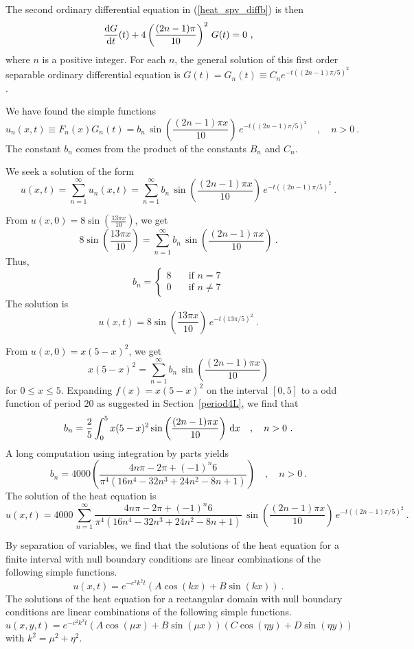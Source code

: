 \begin{egg}
The second ordinary differential equation in (\ref{heat_spv_diffb}) is then
\[
\frac{\mathrm{d}G}{\mathrm{d}{t}}(t) + 4\left(\frac{(2n-1)\pi}{10}\right)^2\,G(t) = 0 \ ,
\]
where $n$ is a positive integer.  For each $n$, the general solution
of this first order separable ordinary differential equation is
$\displaystyle G(t) = G_n(t) \equiv C_n e^{-t ((2n-1)\pi/5)^2}$.

We have found the simple functions
\[
u_n(x,t) \equiv F_n(x)G_n(t) = b_n\,\sin\left(\frac{(2n-1)\pi x}{10}\right)
\, e^{-t ((2n-1)\pi/5)^2} \quad , \quad n > 0 \ .
\]
The constant $b_n$ comes from the product of the constants $B_n$ and
$C_n$.

We seek a solution of the form
\[
u(x,t) = \sum_{n=1}^\infty u_n(x,t)
= \sum_{n=1}^\infty b_n\,\sin\left(\frac{(2n-1)\pi x}{10}\right)
\, e^{-t ((2n-1)\pi/5)^2} \  .
\]

 From
$\displaystyle u(x,0) = 8 \sin\left(\frac{13\pi x}{10}\right)$,
we get
\[
8 \sin\left(\frac{13\pi x}{10}\right)
= \sum_{n=1}^\infty b_n\,\sin\left(\frac{(2n-1)\pi x}{10}\right) \  .
\]
Thus,
\[
b_n =
\begin{cases}
8 & \quad \text{if $n=7$} \\
0 & \quad \text{if $n\neq 7$}
\end{cases}
\]
The solution is
\[
u(x,t) = 8 \sin\left(\frac{13 \pi x}{10}\right)
\, e^{-t (13\pi/5)^2} \  .
\]

 From $u(x,0) = x(5-x)^2$, we get
\[
x(5-x)^2 = \sum_{n=1}^\infty b_n\,\sin\left(\frac{(2n-1)\pi x}{10}\right)
\]
for $0\leq x\leq 5$.  Expanding $f(x) = x(5-x)^2$ on the interval
$[0,5]$ to a odd function of period $20$ as suggested in
Section~\ref{period4L}, we find that
\[
b_n = \frac{2}{5} \int_0^5 x(5-x)^2
\sin\left(\frac{(2n-1)\pi x}{10}\right) \dx{x} \quad , \quad n>0 \ .
\]
A long computation using integration by parts yields
\[
b_n = 4000\left( \frac{4n\pi - 2\pi + (-1)^n 6}
{\pi^4(16n^4 -32 n^3 +24 n^2 -8n +1)}\right) \quad , \quad n > 0 \ .
\]
The solution of the heat equation is
\[
u(x,t) = 
4000\, \sum_{n=1}^\infty \frac{4n\pi - 2\pi + (-1)^n 6}
{\pi^4(16n^4 -32 n^3 +24 n^2 -8n +1)} \,
\sin\left(\frac{(2n-1)\pi x}{10}\right)\, e^{-t ((2n-1)\pi/5)^2} \  .
\]
\end{egg}

\begin{rmk}
By separation of variables, we find that the solutions of the heat
equation for a finite interval with null boundary 
conditions are linear combinations of the following simple functions.
\[
u(x,t) = e^{-c^2 k^2 t}(A \cos (kx) + B \sin(kx)) \ .
\]
The solutions of the heat equation for a rectangular domain with
null boundary conditions are linear combinations of the following
simple functions.
\[
u(x,y,t) = e^{-c^2 k^2 t}(A \cos (\mu x) +B \sin (\mu x))
(C \cos (\eta y) + D \sin (\eta y))
\]
with $k^2 = \mu^2 + \eta^2$.
\end{rmk}

